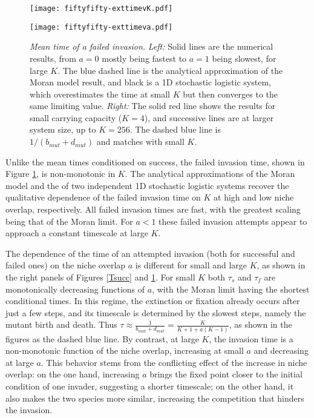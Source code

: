 \begin{figure}[h]
	\centering
	\begin{minipage}{0.49\linewidth}
		\centering
		\texttt{[image: fiftyfifty-exttimevK.pdf]}
	\end{minipage}
	\begin{minipage}{0.49\linewidth}
		\centering
		\texttt{[image: fiftyfifty-exttimeva.pdf]}
	\end{minipage}
	\caption{\emph{Mean time of a failed invasion.}
		\emph{Left:} Solid lines are the numerical results, from $a=0$ mostly being fastest to $a=1$ being slowest, for large $K$. The blue dashed line is the analytical approximation of the Moran model result, and black is a 1D stochastic logistic system, which overestimates the time at small $K$ but then converges to the same limiting value.
		\emph{Right:} The solid red line shows the results for small carrying capacity ($K=4$), and successive lines are at larger system size, up to $K=256$. The dashed blue line is $1/(b_{mut}+d_{mut})$ and matches with small $K$.
	} \label{Tfail}
\end{figure}

Unlike the mean times conditioned on success, the failed invasion time, shown in Figure \ref{Tfail}, is non-monotonic in $K$. 
The analytical approximations of the Moran model and the of two independent 1D stochastic logistic systems recover the qualitative dependence of the failed invasion time on $K$ at high and low niche overlap, respectively. 
All failed invasion times are fast, with the greatest scaling being that of the Moran limit. 
For $a<1$ these failed invasion attempts appear to approach a constant timescale at large $K$.

The dependence of the time of an attempted invasion (both for successful and failed ones) on the niche overlap $a$ is different for small and large $K$, as shown in the right panels of Figures \ref{Tsucc} and \ref{Tfail}. 
For small $K$ both $\tau_s$ and $\tau_f$ are monotonically decreasing functions of $a$, with the Moran limit having the shortest conditional times. 
In this regime, the extinction or fixation already occurs after just a few steps, and its timescale is determined by the slowest steps, namely the mutant birth and death. 
Thus $\tau \approx \frac{1}{b_{mut}+d_{mut}}=\frac{K}{K+1+a(K-1)}$, as shown in the figures as the dashed blue line. 
By contrast, at large $K$, the invasion time is a non-monotonic function of the niche overlap, increasing at small $a$ and decreasing at large $a$. 
This behavior stems from the conflicting effect of the increase in niche overlap: on the one hand, increasing $a$ brings the fixed point closer to the initial condition of one invader, suggesting a shorter timescale; on the other hand, it also makes the two species more similar, increasing the competition that hinders the invasion.


